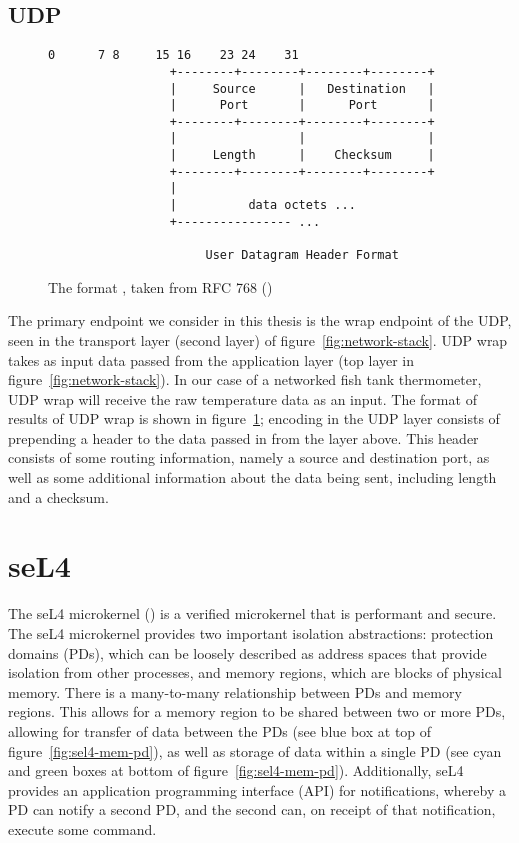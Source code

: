 \documentclass[twoside]{memoir}
\begin{document}
\subsection{UDP}
\begin{figure}[htb]
    \centering
\begin{lstlisting}[language=file]
                  0      7 8     15 16    23 24    31
                 +--------+--------+--------+--------+
                 |     Source      |   Destination   |
                 |      Port       |      Port       |
                 +--------+--------+--------+--------+
                 |                 |                 |
                 |     Length      |    Checksum     |
                 +--------+--------+--------+--------+
                 |
                 |          data octets ...
                 +---------------- ...

                      User Datagram Header Format
\end{lstlisting}
    \caption{The format , taken from RFC 768 (\cite{rfc768})}
    \label{fig:udp-wrap-rfc}
\end{figure}
The primary endpoint we consider in this thesis is
the wrap endpoint of the UDP,
seen in the transport layer (second layer) of figure~\ref{fig:network-stack}.
UDP wrap takes as input data passed from the application layer (top layer in figure~\ref{fig:network-stack}).
In our case of a networked fish tank thermometer, UDP wrap will receive the raw temperature data as an input.
The format of results of UDP wrap is shown in figure~\ref{fig:udp-wrap-rfc};
encoding in the UDP layer consists of prepending a header
to the data passed in from the layer above.
This header consists of some routing information, namely a source and
destination port, as well as some additional information about the
data being sent, including length and a checksum.



\section{seL4}
The seL4 microkernel (\cite{Klein2014Verification}) is a verified microkernel
that is performant and secure.
The seL4 microkernel provides two important isolation abstractions:
protection domains (PDs),
which can be loosely described as address spaces that provide isolation from
other processes,
and memory regions, which are blocks of physical memory.
There is a many-to-many relationship between PDs and memory regions.
This allows for a memory region to be shared between two or more PDs,
allowing for transfer of data between the PDs
(see blue box at top of figure~\ref{fig:sel4-mem-pd}),
as well as storage of data within
a single PD
(see cyan and green boxes at bottom of figure~\ref{fig:sel4-mem-pd}).
Additionally, seL4 provides an application programming interface (API) for notifications,
whereby a PD can notify a second PD, and the second can,
on receipt of that notification, execute some command.
\end{document}
